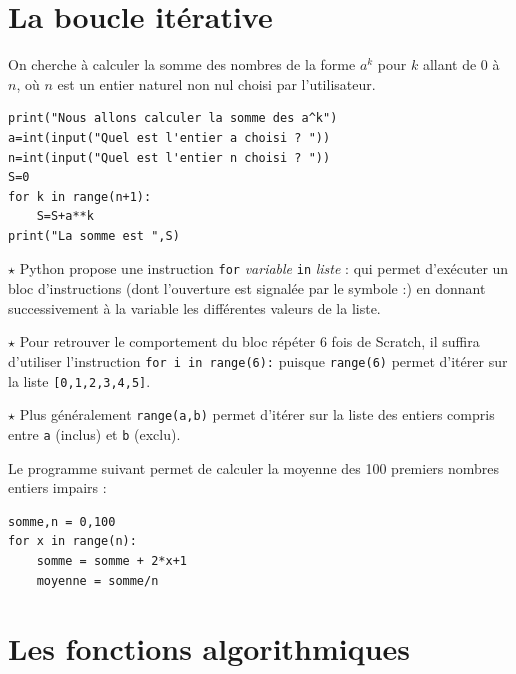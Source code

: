 \section{La boucle itérative}

On cherche à calculer la somme des nombres de la forme $a^k$ pour $k$ allant de 0 à $n$, où $n$ est un entier naturel non nul choisi par l'utilisateur.

\begin{lstlisting}
print("Nous allons calculer la somme des a^k")
a=int(input("Quel est l'entier a choisi ? "))
n=int(input("Quel est l'entier n choisi ? "))
S=0
for k in range(n+1):
    S=S+a**k
print("La somme est ",S)
\end{lstlisting}

\begin{Rmq}[s]
$\star$ Python propose une instruction \og \verb!for! \textit{variable} \verb!in! \textit{liste} :\fg{} qui permet d'exécuter un bloc d'instructions (dont l'ouverture est signalée par le symbole :) en donnant successivement à la variable les différentes valeurs de la liste.

$\star$ Pour retrouver le comportement du bloc répéter 6 fois de Scratch, il suffira d'utiliser l'instruction \og \verb!for i in range(6):!\fg{} puisque \verb!range(6)! permet d'itérer sur la liste \verb![0,1,2,3,4,5]!. 

$\star$ Plus généralement \verb!range(a,b)! permet d'itérer sur la liste des entiers compris entre \verb!a! (inclus) et \verb!b! (exclu).
\end{Rmq}

\begin{Exemple}[]{}
Le programme suivant permet de calculer la moyenne des 100 premiers nombres entiers impairs :
\end{Exemple}

\begin{lstlisting}
somme,n = 0,100
for x in range(n):
	somme = somme + 2*x+1
	moyenne = somme/n
\end{lstlisting}



\section{Les fonctions algorithmiques}
